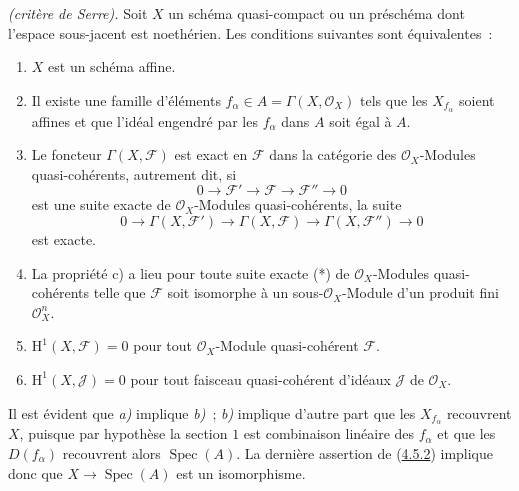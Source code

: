 \begin{theorem}[5.2.1]
\label{II.5.2.1-fr}
\emph{(critère de Serre).} Soit $X$ un schéma quasi-compact ou un préschéma
dont l'espace sous-jacent est noethérien. Les conditions suivantes sont
équivalentes~:
\begin{enumerate}
  \item[\rm{a)}] $X$ est un schéma affine.
  \item[\rm{b)}] Il existe une famille d'éléments
  $f_\alpha\in A=\Gamma(X,\mathcal{O}_X)$ tels que les $X_{f_\alpha}$ soient
  affines et que l'idéal engendré par les $f_\alpha$ dans $A$ soit égal à
  $A$.
  \item[\rm{c)}] Le foncteur $\Gamma(X,\mathcal{F})$ est exact en
  $\mathcal{F}$ dans la catégorie des $\mathcal{O}_X$-Modules
  quasi-cohérents, autrement dit, si
  \[
    0\to\mathcal{F}'\to\mathcal{F}\to\mathcal{F}''\to0 \tag{*}
  \]
  est une suite exacte de $\mathcal{O}_X$-Modules quasi-cohérents, la suite
  \[
    0\to\Gamma(X,\mathcal{F}')\to\Gamma(X,\mathcal{F})
      \to\Gamma(X,\mathcal{F}'')\to0
  \]
  est exacte.
  \item[\rm{c')}] La propriété \textup{c)} a lieu pour toute suite exacte \textup{(*)} de
  $\mathcal{O}_X$-Modules quasi-cohérents telle que $\mathcal{F}$ soit
  isomorphe à un sous-$\mathcal{O}_X$-Module d'un produit fini
  $\mathcal{O}_X^n$.
  \item[\rm{d)}] $\mathrm{H}^1(X,\mathcal{F})=0$ pour tout
  $\mathcal{O}_X$-Module quasi-cohérent $\mathcal{F}$.
  \item[\rm{d')}] $\mathrm{H}^1(X,\mathcal{J})=0$ pour tout faisceau
  quasi-cohérent d'idéaux $\mathcal{J}$ de $\mathcal{O}_X$.
\end{enumerate}
\end{theorem}

Il est évident que \emph{a)} implique \emph{b)}~; \emph{b)} implique d'autre part que les
$X_{f_\alpha}$ recouvrent $X$, puisque par hypothèse la section $1$ est
combinaison linéaire des $f_\alpha$ et que les $D(f_\alpha)$ recouvrent
alors $\operatorname{Spec}(A)$. La dernière assertion de
(\hyperref[II.4.5.2-fr]{4.5.2}) implique donc que
$X\to\operatorname{Spec}(A)$ est un isomorphisme.

